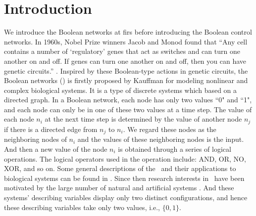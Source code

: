 \section{Introduction}
\label{sec:intro}

We introduce the Boolean networks at firs before introducing the Boolean control networks. In 1960s, Nobel Prize winners Jacob and Monod found that ``Any cell contains a number of `regulatory' genes that act as switches and can turn one another on and off. If genes can turn one another on and off, then you can have genetic circuits.'' \cite{Jacob1961Genetic}. Inspired by these Boolean-type actions in genetic circuits, the Boolean networks (\BNs) is firstly proposed by Kauffman \cite{Kauffman1968Metabolic} for modeling nonlinear and complex biological systems. It is a type of discrete systems which based on a directed graph. In a Boolean network, each node has only two values ``0" and ``1", and each node can only be in one of these two values at a time step. The value of each node $n_i$ at the next time step is determined by the value of another node $n_j$ if there is a directed edge from $n_j$ to $n_i$. We regard these nodes as the neighboring nodes of $n_i$ and the values of these neighboring nodes is the input. And then a new value of the node $n_i$ is obtained through a series of logical operations. The logical operators used in the operation include: AND, OR, NO, XOR, and so on. Some general descriptions of the \BNs\ and their applications to biological systems can be found in \cite{Kauffman1968Metabolic}. Since then research interests in \BNs\ have been motivated by the large number of natural and artificial systems \cite{Akutsu2000Inferring, Shmulevich2002From, Faur2006Dynamical,Green2007The,Lou2010Multi}. And these systems' describing variables display only two distinct configurations, and hence these describing variables take only two values, i.e., $\{0,1\}$.

